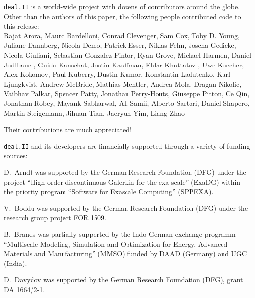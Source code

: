 \documentclass{ansarticle-preprint}
\newcommand{\specialword}[1]{\texttt{#1}}
\newcommand{\dealii}{{\specialword{deal.II}}}
\begin{document}
\dealii{} is a world-wide project with dozens of contributors around the
globe. Other than the authors of this paper, the following people contributed code to
this release:\\
%
%
  Rajat Arora,
  Mauro Bardelloni,
  Conrad Clevenger,
  Sam Cox,
  Toby D. Young,
  Juliane Dannberg,
  Nicola Demo,
  Patrick Esser,
  Niklas Fehn,
  Joscha Gedicke,
  Nicola Giuliani,
  Sebastian Gonzalez-Pintor,
  Ryan Grove,
  Michael Harmon,
  Daniel Jodlbauer,
  Guido Kanschat,
  Justin Kauffman,
  Eldar Khattatov ,
  Uwe Koecher,
  Alex Kokomov,
  Paul Kuberry,
  Dustin Kumor,
  Konstantin Ladutenko,
  Karl Ljungkvist,
  Andrew McBride,
  Mathias Mentler,
  Andrea Mola,
  Dragan Nikolic,
  Vaibhav Palkar,
  Spencer Patty,
  Jonathan Perry-Houts,
  Giuseppe Pitton,
  Ce Qin,
  Jonathan Robey,
  Mayank Sabharwal,
  Ali Samii,
  Alberto Sartori,
  Daniel Shapero,
  Martin Steigemann,
  Jihuan Tian,
  Jaeryun Yim,
  Liang Zhao


Their contributions are much appreciated!


\bigskip

\dealii{} and its developers are financially supported through a
variety of funding sources:

D.~Arndt was supported by the German Research Foundation (DFG) under the
project ``High-order discontinuous Galerkin for the exa-scale'' (ExaDG) within the
priority program ``Software for Exascale Computing'' (SPPEXA).



V.~Boddu was supported by the German Research Foundation (DFG) under the
research group project FOR 1509.

B.~Brands was partially supported by the Indo-German exchange programm
``Multiscale Modeling, Simulation and Optimization for Energy, Advanced
Materials and Manufacturing'' (MMSO) funded by DAAD (Germany) and UGC
(India).

D.~Davydov was supported by the German Research Foundation (DFG), grant DA
1664/2-1.
\end{document}
